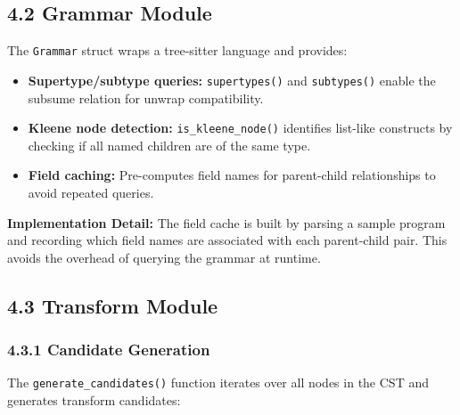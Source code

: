 \documentclass[
  letterpaper,
]{article}
\providecommand{\tightlist}{%
  \setlength{\itemsep}{0pt}\setlength{\parskip}{0pt}}
\begin{document}
\subsection{4.2 Grammar Module}\label{grammar-module}

The \texttt{Grammar} struct wraps a tree-sitter language and provides:

\begin{itemize}
\tightlist
\item
  \textbf{Supertype/subtype queries:} \texttt{supertypes()} and
  \texttt{subtypes()} enable the subsume relation for unwrap
  compatibility.
\item
  \textbf{Kleene node detection:} \texttt{is\_kleene\_node()} identifies
  list-like constructs by checking if all named children are of the same
  type.
\item
  \textbf{Field caching:} Pre-computes field names for parent-child
  relationships to avoid repeated queries.
\end{itemize}

\textbf{Implementation Detail:} The field cache is built by parsing a
sample program and recording which field names are associated with each
parent-child pair. This avoids the overhead of querying the grammar at
runtime.

\subsection{4.3 Transform Module}\label{transform-module}

\subsubsection{4.3.1 Candidate Generation}\label{candidate-generation-1}

The \texttt{generate\_candidates()} function iterates over all nodes in
the CST and generates transform candidates:
\end{document}
